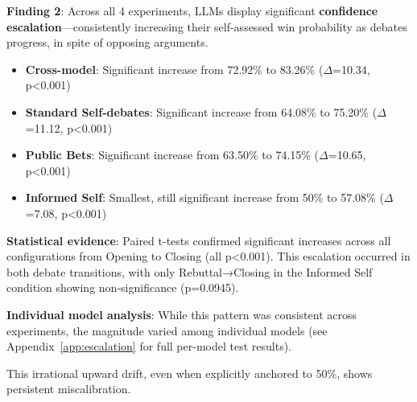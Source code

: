 \documentclass{article}
\begin{document}
\textbf{Finding 2}: Across all 4 experiments, LLMs display significant \textbf{confidence escalation}—consistently increasing their self-assessed win probability as debates progress, in spite of opposing arguments.

\begin{itemize}
    \item \textbf{Cross-model}: Significant increase from 72.92\% to 83.26\% ($\Delta$=10.34, p<0.001)
    \item \textbf{Standard Self-debates}: Significant increase from 64.08\% to 75.20\% ($\Delta$=11.12, p<0.001)
    \item \textbf{Public Bets}: Significant increase from 63.50\% to 74.15\% ($\Delta$=10.65, p<0.001)
    \item \textbf{Informed Self}: Smallest, still significant increase from 50\% to 57.08\% ($\Delta$=7.08, p<0.001)
\end{itemize}

\textbf{Statistical evidence}: Paired t-tests confirmed significant increases across all configurations from Opening to Closing (all p<0.001). This escalation occurred in both debate transitions, with only Rebuttal→Closing in the Informed Self condition showing non-significance (p=0.0945).

\textbf{Individual model analysis}: While this pattern was consistent across experiments, the magnitude varied among individual models (see Appendix~\ref{app:escalation} for full per-model test results).

This irrational upward drift, even when explicitly anchored to 50\%, shows persistent miscalibration.
\end{document}
